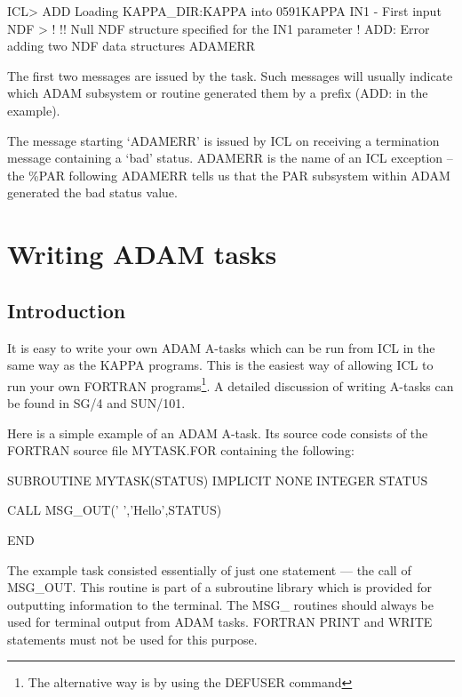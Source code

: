 \documentclass[twoside,11pt,nolof,chapters]{starlink}
\begin{document}
\begin{terminalv}
    ICL> ADD
    Loading KAPPA_DIR:KAPPA into 0591KAPPA
    IN1 - First input NDF > !
    !! Null NDF structure specified for the IN1 parameter
    !  ADD: Error adding two NDF data structures
    ADAMERR   %
\end{terminalv}

The first two messages are issued by the task. Such messages will usually
indicate which ADAM subsystem or routine generated them by a prefix (ADD:
in the example).

The message starting `ADAMERR' is issued by ICL on receiving a termination
message containing a `bad' status.
ADAMERR is the name of an ICL exception -- the \%PAR following ADAMERR tells
us that the PAR subsystem within ADAM generated the bad status value.


\chapter{Writing ADAM tasks\label{writing_adam_tasks}}

\section{Introduction}

It is easy to write your own ADAM A-tasks which can be run from ICL in the
same way as the KAPPA programs. This is the easiest way of allowing ICL
to run your own FORTRAN programs\footnote{The alternative way is by using
the DEFUSER command}.
A detailed discussion of writing A-tasks can be found in SG/4 and SUN/101.

Here is a simple example of an ADAM A-task. Its source code consists of
the FORTRAN source file MYTASK.FOR containing the following:

\begin{terminalv}
    SUBROUTINE MYTASK(STATUS)
    IMPLICIT NONE
    INTEGER STATUS

    CALL MSG_OUT(' ','Hello',STATUS)

    END
\end{terminalv}
The example task consisted essentially of just one statement --- the call
of MSG\_OUT. This routine is part of a subroutine library which is provided
for outputting information to the terminal. The MSG\_ routines should always
be used for terminal output from ADAM tasks. FORTRAN PRINT and WRITE statements
must not be used for this purpose.
\end{document}

